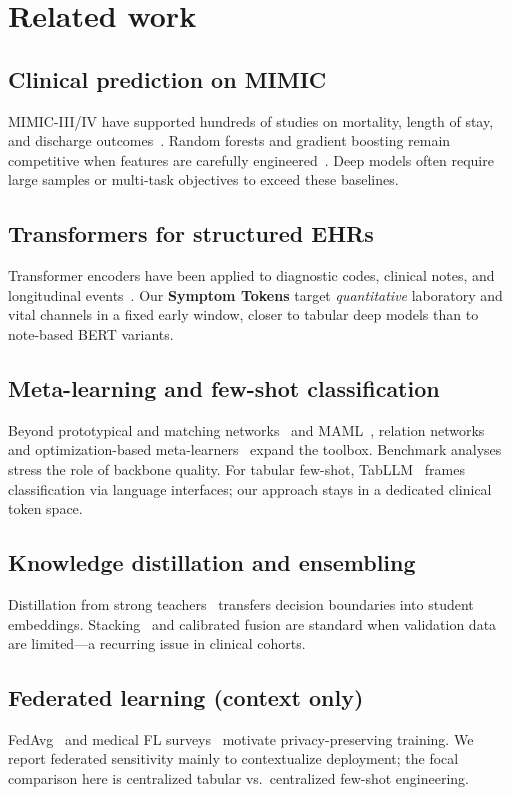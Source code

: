 \section{Related work}
\label{sec:related}

\subsection{Clinical prediction on MIMIC}
MIMIC-III/IV have supported hundreds of studies on mortality, length of stay, and discharge outcomes~\citep{johnson2023mimic,harutyunyan2019multitask,purushotham2018benchmarking}. Random forests and gradient boosting remain competitive when features are carefully engineered~\citep{awad2017random}. Deep models often require large samples or multi-task objectives to exceed these baselines.

\subsection{Transformers for structured EHRs}
Transformer encoders have been applied to diagnostic codes, clinical notes, and longitudinal events~\citep{li2020behrt,rasmy2021med}. Our \textbf{Symptom Tokens} target \emph{quantitative} laboratory and vital channels in a fixed early window, closer to tabular deep models than to note-based BERT variants.

\subsection{Meta-learning and few-shot classification}
Beyond prototypical and matching networks~\citep{snell2017prototypical,vinyals2016matching} and MAML~\citep{finn2017model}, relation networks~\citep{sung2018learning} and optimization-based meta-learners~\citep{ravi2016meta} expand the toolbox. Benchmark analyses~\citep{chen2019closer} stress the role of backbone quality. For tabular few-shot, TabLLM~\citep{hegselmann2023tabllm} frames classification via language interfaces; our approach stays in a dedicated clinical token space.

\subsection{Knowledge distillation and ensembling}
Distillation from strong teachers~\citep{hinton2015distilling} transfers decision boundaries into student embeddings. Stacking~\citep{wolpert1992stacked} and calibrated fusion are standard when validation data are limited---a recurring issue in clinical cohorts.

\subsection{Federated learning (context only)}
FedAvg~\citep{mcmahan2017communication} and medical FL surveys~\citep{rieke2020future,sheller2020federated} motivate privacy-preserving training. We report federated sensitivity mainly to contextualize deployment; the focal comparison here is centralized tabular vs.\ centralized few-shot engineering.
